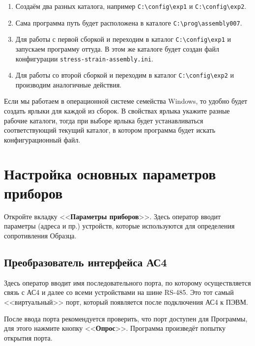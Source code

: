 \documentclass[12pt, a4paper, twocolumn]{report}
\newcommand{\PROGNAME}{stress-strain-assembly}
\newcommand{\CTL}[1]{<<{\bf #1}>>}
\newcommand{\FILENAME}[1]{{\tt #1}}
\begin{document}
\begin{enumerate}
\item Создаём два разных каталога, например \FILENAME{C:\textbackslash{}config\textbackslash{}exp1} и \FILENAME{C:\textbackslash{}config\textbackslash{}exp2}.

\item Сама программа путь будет расположена в каталоге \FILENAME{C:\textbackslash{}prog\textbackslash{}assembly007}.

\item Для работы с первой сборкой и переходим в каталог \FILENAME{C:\textbackslash{}config\textbackslash{}exp1} и запускаем программу оттуда. В этом же каталоге будет создан файл конфигурации \FILENAME{\PROGNAME{}.ini}.

\item Для работы со второй сборкой и переходим в каталог \FILENAME{C:\textbackslash{}config\textbackslash{}exp2} и производим аналогичные действия.

\end{enumerate}

Если мы работаем в операционной системе семейства Windows, то удобно будет создать ярлыки для каждой из сборок. В свойствах ярлыка укажите разные рабочие каталоги, тогда при выборе ярлыка будет устанавливаться соответствующий текущий каталог, в котором программа будет искать конфигурационный файл.

\section{Настройка основных параметров приборов}

Откройте вкладку \CTL{Параметры приборов}. Здесь оператор вводит параметры (адреса и пр.) устройств, которые используются для определения сопротивления Образца.

\subsection{Преобразователь интерфейса АС4}

Здесь оператор вводит имя последовательного порта, по которому осуществляется связь с АС4 и далее со всеми устройствами на шине RS-485. Это тот самый <<виртуальный>> порт, который появляется после подключения АС4 к ПЭВМ.

После ввода порта рекомендуется проверить, что порт доступен для Программы, для этого нажмите кнопку \CTL{Опрос}. Программа произведёт попытку открытия порта.
\end{document}
